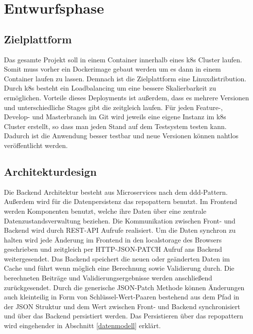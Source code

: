 \section{Entwurfsphase}
\label{entwurfsphase}
\subsection{Zielplattform}
\label{zielplattform}
Das gesamte Projekt soll in einem \gls{Container} innerhalb eines \gls{k8s} Cluster laufen. Somit muss vorher ein Dockerimage gebaut werden um es dann in einem Container laufen zu lassen. Demnach ist die Zielplattform eine Linuxdistribution. Durch \gls{k8s} besteht ein Loadbalancing um eine bessere Skalierbarkeit zu ermöglichen. Vorteile dieses Deployments ist außerdem, dass es mehrere Versionen und unterschiedliche Stages gibt die zeitgleich laufen. Für jeden Feature-, Develop- und Masterbranch im Git wird jeweils eine eigene Instanz im \gls{k8s} Cluster erstellt, so dass man jeden Stand auf dem Testsystem testen kann. Dadurch ist die Anwendung besser testbar und neue Versionen können nahtlos veröffentlicht werden.
\subsection{Architekturdesign}
\label{architekturdesign}
Die Backend Architektur besteht aus Microservices nach dem \gls{ddd}-Pattern. Außerdem wird für die Datenpersistenz das \gls{repopattern} benutzt. Im Frontend werden Komponenten benutzt, welche ihre Daten über eine zentrale Datenzustandsverwaltung beziehen. Die Kommunikation zwischen Front- und Backend wird durch REST-API Aufrufe realisiert. Um die Daten synchron zu halten wird jede Änderung im Frontend in den \gls{localstorage} des Browsers geschrieben und zeitgleich per HTTP-JSON-PATCH Aufruf ans Backend weitergesendet. Das Backend speichert die neuen oder geänderten Daten im Cache und führt wenn möglich eine Berechnung sowie Validierung durch. Die berechneten Beiträge und Validierungsergebnisse werden anschließend zurückgesendet. Durch die generische JSON-Patch Methode können Änderungen auch kleinteilig in Form von Schlüssel-Wert-Paaren bestehend aus dem Pfad in der JSON Struktur und dem Wert zwischen Front- und Backend synchronisiert und über das Backend persistiert werden. Das Persistieren über das \gls{repopattern} wird eingehender in Abschnitt \ref{datenmodell}  erklärt.
